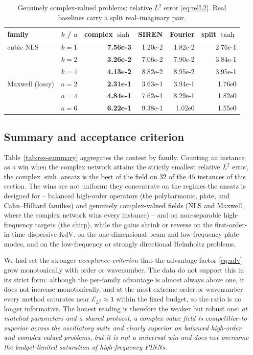 \begin{table}[htbp]
\centering
\small
\caption{Genuinely complex-valued problems: relative \(L^2\) error
\eqref{eq:relL2}. Real baselines carry a split real--imaginary pair.}
\label{tab:res-cplx}
\begin{tabular}{@{}llrrrr@{}}
\toprule
family & \(k\) / \(a\) & complex \(\sinh\) & SIREN & Fourier & split \(\tanh\) \\
\midrule
cubic NLS       & \(k{=}1\) & \textbf{7.56e-3} & 1.20e-2 & 1.82e-2 & 2.76e-1 \\
                & \(k{=}2\) & \textbf{3.26e-2} & 7.06e-2 & 7.90e-2 & 3.84e-1 \\
                & \(k{=}4\) & \textbf{4.13e-2} & 8.82e-2 & 8.95e-2 & 3.95e-1 \\
\midrule
Maxwell (lossy) & \(a{=}2\) & \textbf{2.31e-1} & 3.63e-1 & 3.94e-1 & 1.76e0 \\
                & \(a{=}4\) & \textbf{4.84e-1} & 7.62e-1 & 8.29e-1 & 1.82e0 \\
                & \(a{=}6\) & \textbf{6.22e-1} & 9.38e-1 & 1.02e0  & 1.55e0 \\
\bottomrule
\end{tabular}
\end{table}

\subsection{Summary and acceptance criterion}\label{ssec:res-summary}

Table~\ref{tab:res-summary} aggregates the contest by family. Counting an
instance as a win when the complex network attains the strictly smallest
relative \(L^2\) error, the complex \(\sinh\) ansatz is the best of the field on
\(32\) of the \(45\) instances of this section. The wins are not uniform: they
concentrate on the regimes the ansatz is designed for -- balanced high-order
operators (the polyharmonic, plate, and Cahn--Hilliard families) and genuinely
complex-valued fields (NLS and Maxwell, where the complex network wins every
instance) -- and on non-separable high-frequency targets (the chirp), while the
gains shrink or reverse on the first-order-in-time dispersive KdV, on the
one-dimensional beam and low-frequency plate modes, and on the low-frequency or
strongly directional Helmholtz problems.

We had set the stronger \emph{acceptance criterion} that the advantage factor
\eqref{eq:adv} grow monotonically with order or wavenumber. The data do not
support this in its strict form: although the per-family advantage is almost
always above one, it does not increase monotonically, and at the most extreme
order or wavenumber every method saturates near \(\mathcal{E}_{L^2}\approx 1\)
within the fixed budget, so the ratio is no longer informative. The honest
reading is therefore the weaker but robust one: \emph{at matched parameters and
a shared protocol, a complex value field is competitive-to-superior across the
oscillatory suite and clearly superior on balanced high-order and
complex-valued problems, but it is not a universal win and does not overcome the
budget-limited saturation of high-frequency PINNs.}

